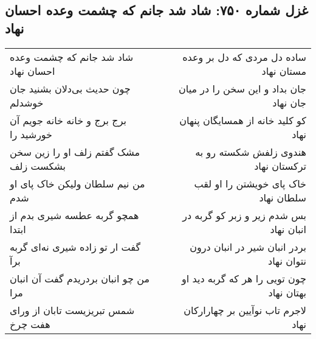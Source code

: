 \begin{center}
\section*{غزل شماره ۷۵۰: شاد شد جانم که چشمت وعده احسان نهاد}
\label{sec:0750}
\begin{longtable}{l p{0.5cm} r}
شاد شد جانم که چشمت وعده احسان نهاد
&&
ساده دل مردی که دل بر وعده مستان نهاد
\\
چون حدیث بی‌دلان بشنید جان خوشدلم
&&
جان بداد و این سخن را در میان جان نهاد
\\
برج برج و خانه خانه جویم آن خورشید را
&&
کو کلید خانه از همسایگان پنهان نهاد
\\
مشک گفتم زلف او را زین سخن بشکست زلف
&&
هندوی زلفش شکسته رو به ترکستان نهاد
\\
من نیم سلطان ولیکن خاک پای او شدم
&&
خاک پای خویشتن را او لقب سلطان نهاد
\\
همچو گربه عطسه شیری بدم از ابتدا
&&
بس شدم زیر و زبر کو گربه در انبان نهاد
\\
گفت ار تو زاده شیری نه‌ای گربه برآ
&&
بردر انبان شیر در انبان درون نتوان نهاد
\\
من چو انبان بردریدم گفت آن انبان مرا
&&
چون تویی را هر که گربه دید او بهتان نهاد
\\
شمس تبریزیست تابان از ورای هفت چرخ
&&
لاجرم تاب نوآیین بر چهارارکان نهاد
\\
\end{longtable}
\end{center}
